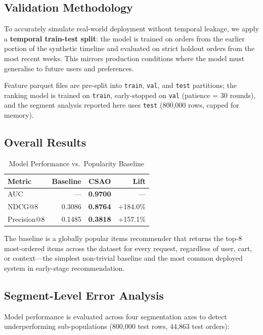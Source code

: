 \documentclass[conference]{IEEEtran}
\begin{document}
\subsection{Validation Methodology}

To accurately simulate real-world deployment without temporal leakage, we apply
a \textbf{temporal train-test split}: the model is trained on orders from
the earlier portion of the synthetic timeline and evaluated on strict holdout
orders from the most recent weeks. This mirrors production conditions where
the model must generalise to future users and preferences.

Feature parquet files are pre-split into \texttt{train}, \texttt{val}, and
\texttt{test} partitions; the ranking model is trained on \texttt{train},
early-stopped on \texttt{val} (patience = 30 rounds), and the segment
analysis reported here uses \texttt{test} (800,000 rows, capped for memory).

\subsection{Overall Results}

\begin{table}[h]
\caption{Model Performance vs.\ Popularity Baseline}
\centering
\begin{tabular}{lrrr}
\toprule
Metric & Baseline & CSAO & Lift \\
\midrule
AUC            & ---    & \textbf{0.9700} & --- \\
NDCG@8         & 0.3086 & \textbf{0.8764} & +184.0\% \\
Precision@8    & 0.1485 & \textbf{0.3818} & +157.1\% \\
\bottomrule
\end{tabular}
\end{table}

The baseline is a globally popular items recommender that returns the top-8
most-ordered items across the dataset for every request, regardless of user,
cart, or context---the simplest non-trivial baseline and the most common
deployed system in early-stage recommendation.

\subsection{Segment-Level Error Analysis}

Model performance is evaluated across four segmentation axes to detect
underperforming sub-populations (800,000 test rows, 44,863 test orders):
\end{document}

